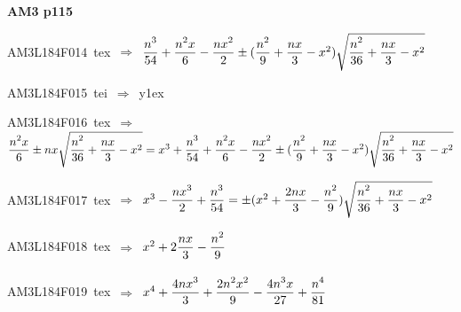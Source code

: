\par\vfill\eject
{\bf\hfill AM3 p115\hfill\hbox{}}\par\bigskip
{\sixrm AM3L184F014\ {\sixit tex}\ }$\Rightarrow$\ ${\displaystyle\strut n^{3}\over \displaystyle\strut 54} + {\displaystyle\strut {n^{2}x}\over \displaystyle\strut 6} - {\displaystyle\strut {nx^{2}}\over \displaystyle\strut 2} \pm  ({\displaystyle\strut n^{2}\over \displaystyle\strut 9} + {\displaystyle\strut {nx}\over \displaystyle\strut 3} - x^{2})\sqrt{{\displaystyle\strut {n^{2}}\over \displaystyle\strut 36} + {\displaystyle\strut {nx}\over \displaystyle\strut 3} - x^{2}}$\par\smallskip
{\sixrm AM3L184F015\ {\sixit tei}\ }$\Rightarrow$\ {\tenit y}\raise1ex\hbox{}\par\smallskip
{\sixrm AM3L184F016\ {\sixit tex}\ }$\Rightarrow$\ ${\displaystyle\strut {n^{2}x}\over \displaystyle\strut 6} \pm  nx\sqrt{{\displaystyle\strut n^{2}\over \displaystyle\strut 36} + {\displaystyle\strut {nx}\over \displaystyle\strut 3} - x^{2}}= x^{3} + {\displaystyle\strut n^{3}\over \displaystyle\strut 54} + {\displaystyle\strut {n^{2}x}\over \displaystyle\strut 6} - {\displaystyle\strut {nx^{2}}\over \displaystyle\strut 2} \pm  ({\displaystyle\strut n^{2}\over \displaystyle\strut 9} + {\displaystyle\strut {nx}\over \displaystyle\strut 3} - x^{2})\sqrt{{\displaystyle\strut n^{2}\over \displaystyle\strut 36} + {\displaystyle\strut {nx}\over \displaystyle\strut 3} - x^{2}}$\par\smallskip
{\sixrm AM3L184F017\ {\sixit tex}\ }$\Rightarrow$\ $x^{3} - {\displaystyle\strut {nx^{3}}\over \displaystyle\strut 2} + {\displaystyle\strut n^{3}\over \displaystyle\strut 54} = \pm  (x^{2} + {\displaystyle\strut {2nx}\over \displaystyle\strut 3} - {\displaystyle\strut n^{2}\over \displaystyle\strut 9})\sqrt{{\displaystyle\strut n^{2}\over \displaystyle\strut 36} + {\displaystyle\strut {nx}\over \displaystyle\strut 3} - x^{2}}$\par\smallskip
{\sixrm AM3L184F018\ {\sixit tex}\ }$\Rightarrow$\ $x^{2} + 2{\displaystyle\strut {nx}\over \displaystyle\strut 3} - {\displaystyle\strut n^{2}\over \displaystyle\strut 9}$\par\smallskip
{\sixrm AM3L184F019\ {\sixit tex}\ }$\Rightarrow$\ $x^{4} + {\displaystyle\strut {4nx^{3}}\over \displaystyle\strut 3} + {\displaystyle\strut {2n^{2}x^{2}}\over \displaystyle\strut 9} - {\displaystyle\strut {4n^{3}x}\over \displaystyle\strut 27} + {\displaystyle\strut n^{4}\over \displaystyle\strut 81}$\par\smallskip
